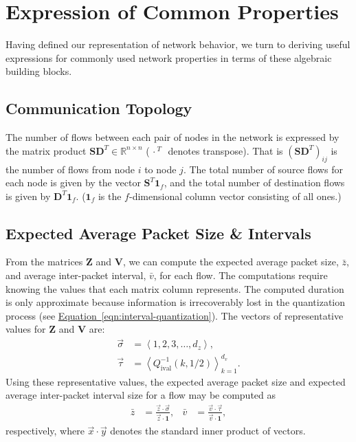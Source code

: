 \documentclass[twocolumn,final]{svjour3}
\newcommand{\Equation}[1]{\hyperref[eqn:#1]{Equation~\ref*{eqn:#1}}}
\newcommand{\R}{\mathbb{R}}
\newcommand{\Di}{Q^{-1}_{\text{ival}}}
\newcommand{\ones}[1]{\mathbf{1}_{#1}}
\newcommand{\mat}[1]{\mathbf{#1}}
\newcommand{\mean}[1]{\bar{#1}}
\newcommand{\trans}[1]{{#1}^T}
\newcommand{\inner}[2]{{#1}\cdot{#2}}
\newcommand{\seq}[1]{\left<#1\right>}
\newcommand{\fracx}[2]{#1/#2}
\begin{document}
\section{Expression of Common Properties}
\label{sec:common-properties}

Having defined our representation of network behavior, we turn to deriving useful expressions for commonly used network properties in terms of these algebraic building blocks.

\subsection{Communication Topology}
\label{sec:communication-topology}

The number of flows between each pair of nodes in the network is expressed by the matrix product $\trans{\mat{SD}}\in\R^{n \times n}$ ($\trans{\,\cdot\,}$~denotes transpose). That is $(\trans{\mat{SD}})_{ij}$ is the number of flows from node $i$ to node $j$. The total number of source flows for each node is given by the vector $\trans{\mat{S}}\ones{f}$, and the total number of destination flows is given by $\trans{\mat{D}}\ones{f}$. ($\ones{f}$ is the $f$-dimensional column vector consisting of all ones.)

\subsection{Expected Average Packet Size \& Intervals}
\label{sec:flow-totals}

From the matrices $\mat{Z}$ and $\mat{V}$, we can compute the expected average packet size, $\mean{z}$, and average inter-packet interval, $\mean{v}$, for each flow. The computations require knowing the values that each matrix column represents. The computed duration is only approximate because information is irrecoverably lost in the quantization process (see \Equation{interval-quantization}). The vectors of representative values for $\mat{Z}$ and $\mat{V}$ are:
\begin{align}
\vec{\sigma}&=\seq{1,2,3,\dots,d_z},\\
\vec{\tau}&=\seq{\Di\left(k,\fracx{1}{2}\right)}_{k=1}^{d_v}.
\end{align}
Using these representative values, the expected average packet size and expected average inter-packet interval size for a flow may be computed as
\begin{align}
  \mean{z}&=\frac{\inner{\vec{z}}{\vec{\sigma}}}{\inner{\vec{z}}{\ones{}}}, &
  \mean{v}&=\frac{\inner{\vec{v}}{\vec{\tau}}}{\inner{\vec{v}}{\ones{}}},
\end{align}
respectively, where $\inner{\vec{x}}{\vec{y}}$ denotes the standard inner product of vectors.
\end{document}
